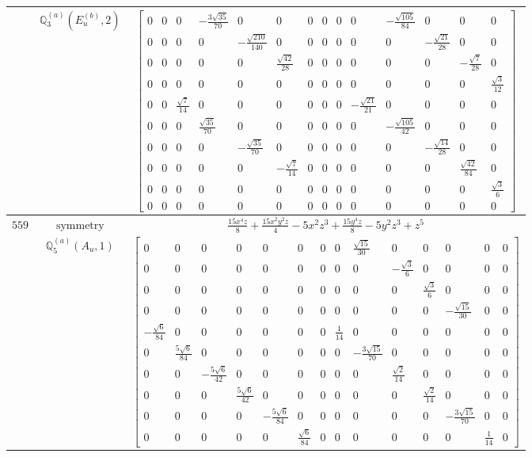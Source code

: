 \documentclass[fleqn,8pt,landscape]{jsarticle}
\begin{document}
\begin{longtable}{ccc}
$  $ & $ \mathbb{Q}_{3}^{(a)}(E_{u}^{(b)},2) $ & $ \begin{bmatrix} 0 & 0 & 0 & - \frac{3 \sqrt{35}}{70} & 0 & 0 & 0 & 0 & 0 & 0 & - \frac{\sqrt{105}}{84} & 0 & 0 & 0 \\ 0 & 0 & 0 & 0 & - \frac{\sqrt{210}}{140} & 0 & 0 & 0 & 0 & 0 & 0 & - \frac{\sqrt{21}}{28} & 0 & 0 \\ 0 & 0 & 0 & 0 & 0 & \frac{\sqrt{42}}{28} & 0 & 0 & 0 & 0 & 0 & 0 & - \frac{\sqrt{7}}{28} & 0 \\ 0 & 0 & 0 & 0 & 0 & 0 & 0 & 0 & 0 & 0 & 0 & 0 & 0 & \frac{\sqrt{3}}{12} \\ 0 & 0 & \frac{\sqrt{7}}{14} & 0 & 0 & 0 & 0 & 0 & 0 & - \frac{\sqrt{21}}{21} & 0 & 0 & 0 & 0 \\ 0 & 0 & 0 & \frac{\sqrt{35}}{70} & 0 & 0 & 0 & 0 & 0 & 0 & - \frac{\sqrt{105}}{42} & 0 & 0 & 0 \\ 0 & 0 & 0 & 0 & - \frac{\sqrt{35}}{70} & 0 & 0 & 0 & 0 & 0 & 0 & - \frac{\sqrt{14}}{28} & 0 & 0 \\ 0 & 0 & 0 & 0 & 0 & - \frac{\sqrt{7}}{14} & 0 & 0 & 0 & 0 & 0 & 0 & \frac{\sqrt{42}}{84} & 0 \\ 0 & 0 & 0 & 0 & 0 & 0 & 0 & 0 & 0 & 0 & 0 & 0 & 0 & \frac{\sqrt{3}}{6} \\ 0 & 0 & 0 & 0 & 0 & 0 & 0 & 0 & 0 & 0 & 0 & 0 & 0 & 0 \end{bmatrix} $ \\ \hline
$ 559 $ & $ \text{symmetry} $ & $ \frac{15 x^{4} z}{8} + \frac{15 x^{2} y^{2} z}{4} - 5 x^{2} z^{3} + \frac{15 y^{4} z}{8} - 5 y^{2} z^{3} + z^{5} $ \\
$  $ & $ \mathbb{Q}_{5}^{(a)}(A_{u},1) $ & $ \begin{bmatrix} 0 & 0 & 0 & 0 & 0 & 0 & 0 & 0 & \frac{\sqrt{15}}{30} & 0 & 0 & 0 & 0 & 0 \\ 0 & 0 & 0 & 0 & 0 & 0 & 0 & 0 & 0 & - \frac{\sqrt{3}}{6} & 0 & 0 & 0 & 0 \\ 0 & 0 & 0 & 0 & 0 & 0 & 0 & 0 & 0 & 0 & \frac{\sqrt{3}}{6} & 0 & 0 & 0 \\ 0 & 0 & 0 & 0 & 0 & 0 & 0 & 0 & 0 & 0 & 0 & - \frac{\sqrt{15}}{30} & 0 & 0 \\ - \frac{\sqrt{6}}{84} & 0 & 0 & 0 & 0 & 0 & 0 & \frac{1}{14} & 0 & 0 & 0 & 0 & 0 & 0 \\ 0 & \frac{5 \sqrt{6}}{84} & 0 & 0 & 0 & 0 & 0 & 0 & - \frac{3 \sqrt{15}}{70} & 0 & 0 & 0 & 0 & 0 \\ 0 & 0 & - \frac{5 \sqrt{6}}{42} & 0 & 0 & 0 & 0 & 0 & 0 & \frac{\sqrt{2}}{14} & 0 & 0 & 0 & 0 \\ 0 & 0 & 0 & \frac{5 \sqrt{6}}{42} & 0 & 0 & 0 & 0 & 0 & 0 & \frac{\sqrt{2}}{14} & 0 & 0 & 0 \\ 0 & 0 & 0 & 0 & - \frac{5 \sqrt{6}}{84} & 0 & 0 & 0 & 0 & 0 & 0 & - \frac{3 \sqrt{15}}{70} & 0 & 0 \\ 0 & 0 & 0 & 0 & 0 & \frac{\sqrt{6}}{84} & 0 & 0 & 0 & 0 & 0 & 0 & \frac{1}{14} & 0 \end{bmatrix} $ \\ \hline

\end{longtable}
\end{document}
